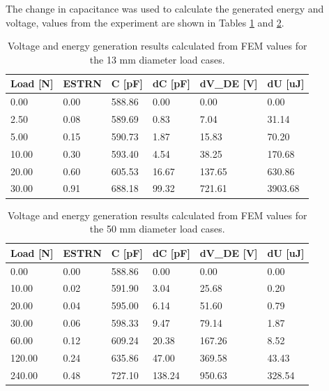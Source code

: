 The change in capacitance was used to calculate the generated energy and voltage, values from the experiment are shown in Tables \ref{tab:volt-energy-gen-d13mm} and \ref{tab:volt-energy-gen-50mm}.

\begin{table}[H]
	\centering
	\caption{Voltage and energy generation results calculated from FEM values for the 13 mm diameter load cases.}
	\label{tab:volt-energy-gen-d13mm}
	\vspace{0.3cm}
	\begin{tabular}{llllll}
		\textbf{Load {[}N{]}} & \textbf{ESTRN} & \textbf{C {[}pF{]}} & \textbf{dC {[}pF{]}} & \textbf{dV\_DE {[}V{]}} & \textbf{dU {[}uJ{]}} \\ \hline
		0.00  & 0.00 & 588.86 & 0.00  & 0.00   & 0.00    \\
		2.50  & 0.08 & 589.69 & 0.83  & 7.04   & 31.14   \\
		5.00  & 0.15 & 590.73 & 1.87  & 15.83  & 70.20   \\
		10.00 & 0.30 & 593.40 & 4.54  & 38.25  & 170.68  \\
		20.00 & 0.60 & 605.53 & 16.67 & 137.65 & 630.86  \\
		30.00 & 0.91 & 688.18 & 99.32 & 721.61 & 3903.68
	\end{tabular}
\end{table}

\begin{table}[H]
	\centering
	\caption{Voltage and energy generation results calculated from FEM values for the 50 mm diameter load cases.}
	\label{tab:volt-energy-gen-50mm}
	\vspace{0.3cm}
	\begin{tabular}{llllll}
		\textbf{Load {[}N{]}} & \textbf{ESTRN} & \textbf{C {[}pF{]}} & \textbf{dC {[}pF{]}} & \textbf{dV\_DE {[}V{]}} & \textbf{dU {[}uJ{]}} \\ \hline
		0.00 & 0.00 & 588.86 & 0.00 & 0.00 & 0.00 \\
		10.00 & 0.02 & 591.90 & 3.04 & 25.68 & 0.20 \\
		20.00 & 0.04 & 595.00 & 6.14 & 51.60 & 0.79 \\
		30.00 & 0.06 & 598.33 & 9.47 & 79.14 & 1.87 \\
		60.00 & 0.12 & 609.24 & 20.38 & 167.26 & 8.52 \\
		120.00 & 0.24 & 635.86 & 47.00 & 369.58 & 43.43 \\
		240.00 & 0.48 & 727.10 & 138.24 & 950.63 & 328.54
	\end{tabular}
\end{table}


